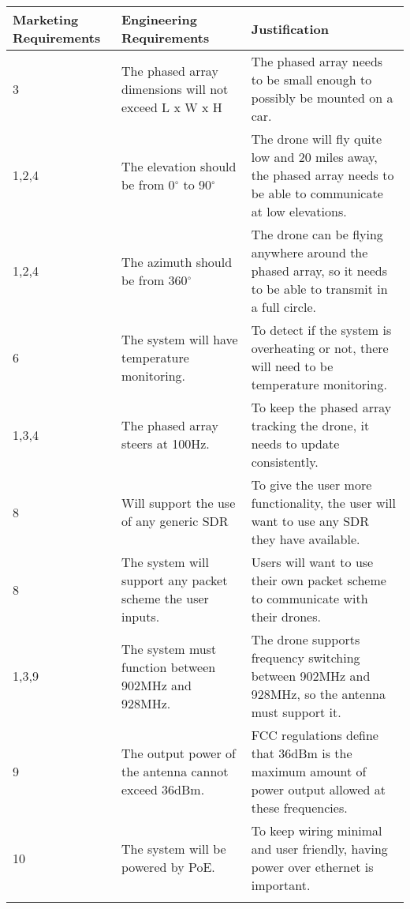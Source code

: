 \documentclass[ProjectRequirements.tex]{subfiles}
\begin{document}
	\begin{center}
	\begin{tabular}{| p{2.3cm} | p{5cm} | p{7cm} |} \hline
		Marketing Requirements & Engineering Requirements & Justification \\ \hline \hline
		3 & The phased array dimensions will not exceed L x W x H & The phased array needs to be small enough to possibly be mounted on a car. \\ \hline
		1,2,4 & The elevation should be from 0$^{\circ}$ to 90$^{\circ}$ & The drone will fly quite low and 20 miles away, the phased array needs to be able to communicate at low elevations.\\\hline
		1,2,4 & The azimuth should be from 360$^{\circ}$ & The drone can be flying anywhere around the phased array, so it needs to be able to transmit in a full circle. \\\hline
		6 & The system will have temperature monitoring. & To detect if the system is overheating or not, there will need to be temperature monitoring. \\\hline
		1,3,4  & The phased array steers at 100Hz. & To keep the phased array tracking the drone, it needs to update consistently. \\\hline
		8 & Will support the use of any generic SDR & To give the user more functionality, the user will want to use any SDR they have available.\\\hline
		8 & The system will support any packet scheme the user inputs. & Users will want to use their own packet scheme to communicate with their drones.\\\hline
		1,3,9 & The system must function between 902MHz and 928MHz. & The drone supports frequency switching between 902MHz and 928MHz, so the antenna must support it.\\\hline
		 9 & The output power of the antenna cannot exceed 36dBm. & FCC regulations define that 36dBm is the maximum amount of power output allowed at these frequencies.\\\hline
		 10 & The system will be powered by PoE. & To keep wiring minimal and user friendly, having power over ethernet is important. \\\hline
		  &  &  \\\hline
	\end{tabular}
	\end{center}
\end{document}

